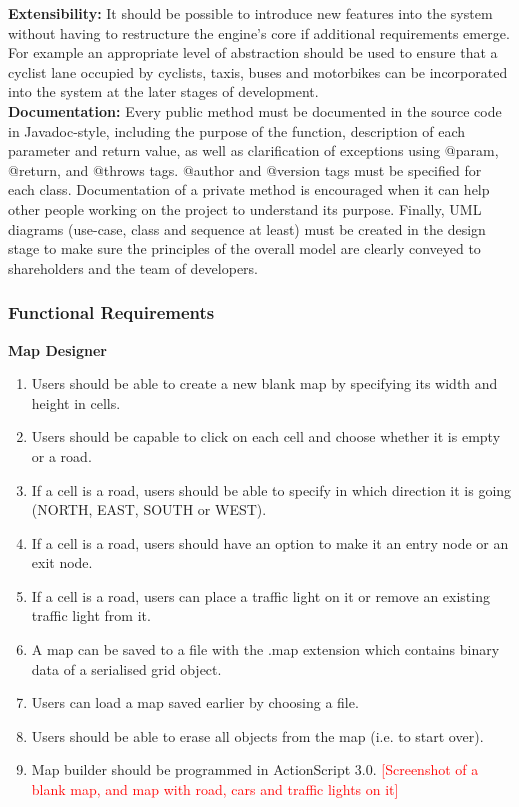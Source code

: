 \documentclass{article}
\begin{document}
	\noindent 
	\textbf{Extensibility:} It should be possible to introduce new features into the system without having to restructure the engine's core if additional requirements emerge. 
	For example an appropriate level of abstraction should be used to ensure that a cyclist lane occupied by cyclists, taxis, buses and motorbikes can be incorporated into the system at the later stages of development.\\
	
	\noindent
	\textbf{Documentation:} Every public method must be documented in the source code in Javadoc-style, including the purpose of the function, description of each parameter and return value, as well as clarification of exceptions using @param, @return, and @throws tags. @author and @version tags must be specified for each class. 
	Documentation of a private method is encouraged when it can help other people working on the project to understand its purpose. 
	Finally, UML diagrams (use-case, class and sequence at least) must be created in the design stage to make sure the principles of the overall model are clearly conveyed to shareholders and the team of developers.  
	
	\subsubsection{Functional Requirements}
	{\bf Map Designer}
	\begin{enumerate}
		\item Users should be able to create a new blank map by specifying its width and height in cells. 
		\item Users should be capable to click on each cell and choose whether it is empty or a road.
		\item If a cell is a road, users should be able to specify in which direction it is going (NORTH, EAST, SOUTH or WEST).
		\item If a cell is a road, users should have an option to make it an entry node or an exit node.
		\item If a cell is a road, users can place a traffic light on it or remove an existing traffic light from it. 
		\item A map can be saved to a file with the .map extension which contains binary data of a serialised grid object.
		\item Users can load a map saved earlier by choosing a file.
		\item  Users should be able to erase all objects from the map (i.e. to start over). 
		\item Map builder should be programmed in ActionScript 3.0. 
		\textcolor{red}{[Screenshot of a blank map, and map with road, cars and traffic lights on it]}
	\end{enumerate}
	
\end{document}
